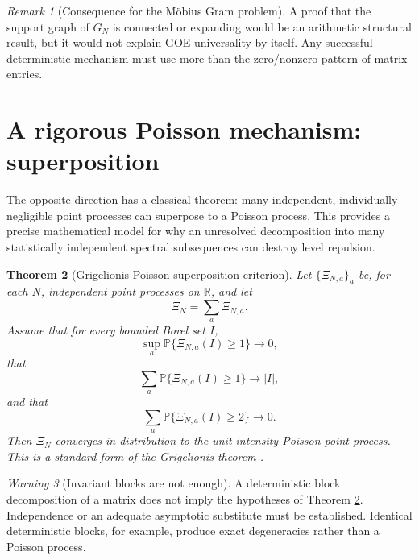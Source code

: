 \documentclass[11pt]{amsart}
\numberwithin{equation}{section}
\theoremstyle{plain}
\newtheorem{theorem}{Theorem}[section]
\theoremstyle{definition}
\theoremstyle{remark}
\newtheorem{remark}[theorem]{Remark}
\newtheorem{warning}[theorem]{Warning}
\begin{document}
\begin{remark}[Consequence for the M\"obius Gram problem]
\label{rem:expansion_consequence}
A proof that the support graph of $G_N$ is connected or expanding would be an arithmetic structural result, but it would not explain GOE universality by itself.  Any successful deterministic mechanism must use more than the zero/nonzero pattern of matrix entries.
\end{remark}

\section{A rigorous Poisson mechanism: superposition}
\label{sec:poisson_superposition}

The opposite direction has a classical theorem: many independent, individually negligible point processes can superpose to a Poisson process.  This provides a precise mathematical model for why an unresolved decomposition into many statistically independent spectral subsequences can destroy level repulsion.

\begin{theorem}[Grigelionis Poisson-superposition criterion]
\label{thm:grigelionis}
Let $\{\Xi_{N,a}\}_a$ be, for each $N$, independent point processes on $\mathbb R$, and let
\begin{equation}
\Xi_N=\sum_a\Xi_{N,a}.
\label{eq:point_superposition}
\end{equation}
Assume that for every bounded Borel set $I$,
\begin{equation}
\sup_a\mathbb P\{\Xi_{N,a}(I)\ge1\}\longrightarrow0,
\label{eq:grigelionis_null}
\end{equation}
that
\begin{equation}
\sum_a\mathbb P\{\Xi_{N,a}(I)\ge1\}\longrightarrow |I|,
\label{eq:grigelionis_intensity}
\end{equation}
and that
\begin{equation}
\sum_a\mathbb P\{\Xi_{N,a}(I)\ge2\}\longrightarrow0.
\label{eq:grigelionis_double}
\end{equation}
Then $\Xi_N$ converges in distribution to the unit-intensity Poisson point process.  This is a standard form of the Grigelionis theorem \cite{Grigelionis1963}.
\end{theorem}

\begin{warning}[Invariant blocks are not enough]
\label{warn:blocks_not_enough}
A deterministic block decomposition of a matrix does not imply the hypotheses of Theorem \ref{thm:grigelionis}.  Independence or an adequate asymptotic substitute must be established.  Identical deterministic blocks, for example, produce exact degeneracies rather than a Poisson process.
\end{warning}
\end{document}
